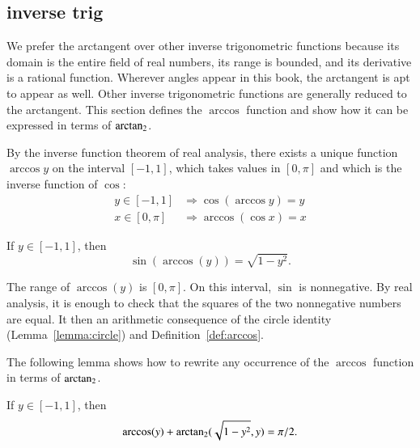 \subsection{inverse trig}
%

We prefer the arctangent over other inverse trigonometric functions
because its domain is the entire field of real numbers, its range is
bounded, and its derivative is a rational function.  Wherever angles
appear in this book, the arctangent is apt to appear as well.  Other
inverse trigonometric functions are generally  reduced to the
arctangent.  This section defines the $\arccos$ function and show how
it can be expressed in terms of ${\operatorname{arctan_2}}$.

\begin{definition}[arccos]
\label{def:arccos}
  By the inverse function theorem of real
    analysis, there exists a unique function $\arccos y$ on the
  interval $[-1,1]$, which takes values in $[0,\pi]$ and which is the
  inverse function of $\cos$:
\begin{align*}
y\in [-1,1] &\Rightarrow \cos(\arccos y) = y\\
x\in[0,\pi] &\Rightarrow \arccos(\cos x) = x
\end{align*}
%
%
\end{definition}


\begin{lemma}[]\label{lemma:sin-arccos}
  If $y\in[-1,1]$, then
\[ \sin(\arccos(y)) = \sqrt{1-y^2}.\] 
\end{lemma}

\begin{proved}
  The range of $\arccos(y)$ is $[0,\pi]$.  On
  this interval, $\sin$ is nonnegative.  By
  real analysis, it is enough to check that
  the squares of the two nonnegative numbers are equal.  It then an
  arithmetic consequence of the circle identity
  (Lemma~\ref{lemma:circle}) and Definition~\ref{def:arccos}.
  \swallowed\end{proved}

The following lemma shows how to rewrite any occurrence of the $\arccos$ function
in terms of  ${\operatorname{arctan_2}}$.   


\begin{lemma}[]\label{lemma:arccos-arctan}
  If $y\in [-1,1]$, then
  \[ \arccos(y) +  {\operatorname{arctan_2}}({
      \sqrt{1-y^2}},{y}) = \pi/2.\] 
\end{lemma}
%
%
%
%

